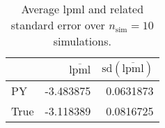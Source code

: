 \begin{table}[H]

\caption{Average lpml and related standard error over $n_{\text{sim}} = 10$ simulations.}
\centering
\begin{tabular}[t]{lrr}
\toprule
  & $\overbar{\text{lpml}}$ & $\text{sd}(\overbar{\text{lpml}})$\\
\midrule
PY & -3.483875 & 0.0631873\\
True & -3.118389 & 0.0816725\\
\bottomrule
\end{tabular}
\end{table}